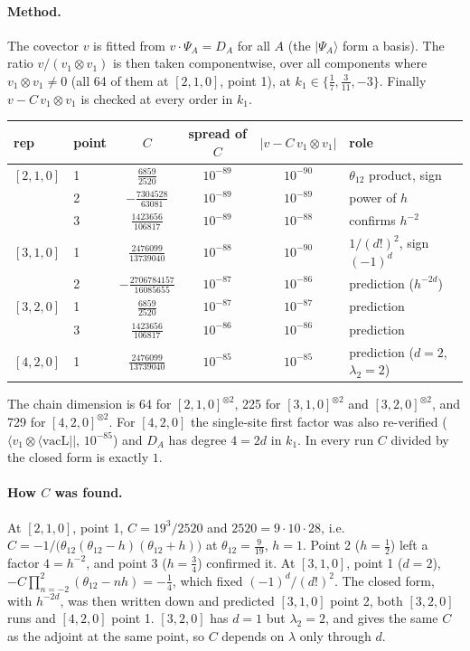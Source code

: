 \documentclass[11pt]{article}
\newcommand{\vacL}{\langle\mathrm{vacL}|}
\theoremstyle{definition}
\theoremstyle{remark}
\begin{document}
\paragraph{Method.}
The covector $v$ is fitted from $v\cdot\Psi_A=D_A$ for all $A$ (the $|\Psi_A\rangle$ form a basis). The ratio $v/(v_1\otimes v_1)$ is then taken componentwise, over all components where $v_1\otimes v_1\neq0$ (all 64 of them at $[2,1,0]$, point 1), at $k_1\in\{\tfrac17,\tfrac3{11},-3\}$. Finally $v-C\,v_1\otimes v_1$ is checked at every order in $k_1$.

\begin{center}
\begin{tabular}{llcccl}\toprule
rep & point & $C$ & spread of $C$ & $|v-C\,v_1\otimes v_1|$ & role\\\midrule
$[2,1,0]$ & 1 & $\tfrac{6859}{2520}$ & $10^{-89}$ & $10^{-90}$ & $\theta_{12}$ product, sign\\
 & 2 & $-\tfrac{7304528}{63081}$ & $10^{-89}$ & $10^{-89}$ & power of $h$\\
 & 3 & $\tfrac{1423656}{106817}$ & $10^{-89}$ & $10^{-88}$ & confirms $h^{-2}$\\
$[3,1,0]$ & 1 & $\tfrac{2476099}{13739040}$ & $10^{-88}$ & $10^{-90}$ & $1/(d!)^2$, sign $(-1)^d$\\
 & 2 & $-\tfrac{2706784157}{16085655}$ & $10^{-87}$ & $10^{-86}$ & prediction ($h^{-2d}$)\\
$[3,2,0]$ & 1 & $\tfrac{6859}{2520}$ & $10^{-87}$ & $10^{-87}$ & prediction\\
 & 3 & $\tfrac{1423656}{106817}$ & $10^{-86}$ & $10^{-86}$ & prediction\\
$[4,2,0]$ & 1 & $\tfrac{2476099}{13739040}$ & $10^{-85}$ & $10^{-85}$ & prediction ($d=2$, $\lambda_2=2$)\\\bottomrule
\end{tabular}
\end{center}
The chain dimension is 64 for $[2,1,0]^{\otimes2}$, 225 for $[3,1,0]^{\otimes2}$ and $[3,2,0]^{\otimes2}$, and 729 for $[4,2,0]^{\otimes2}$. For $[4,2,0]$ the single-site first factor was also re-verified ($\langle v_1\otimes\vacL|$, $10^{-85}$) and $D_A$ has degree $4=2d$ in $k_1$. In every run $C$ divided by the closed form is exactly $1$.

\paragraph{How $C$ was found.}
At $[2,1,0]$, point 1, $C=19^3/2520$ and $2520=9\cdot10\cdot28$, i.e.\ $C=-1/\big(\theta_{12}(\theta_{12}-h)(\theta_{12}+h)\big)$ at $\theta_{12}=\tfrac9{19}$, $h=1$. Point 2 ($h=\tfrac12$) left a factor $4=h^{-2}$, and point 3 ($h=\tfrac34$) confirmed it. At $[3,1,0]$, point 1 ($d=2$), $-C\prod_{n=-2}^{2}(\theta_{12}-nh)=-\tfrac14$, which fixed $(-1)^d/(d!)^2$. The closed form, with $h^{-2d}$, was then written down and predicted $[3,1,0]$ point 2, both $[3,2,0]$ runs and $[4,2,0]$ point 1. $[3,2,0]$ has $d=1$ but $\lambda_2=2$, and gives the same $C$ as the adjoint at the same point, so $C$ depends on $\lambda$ only through $d$.
\end{document}
